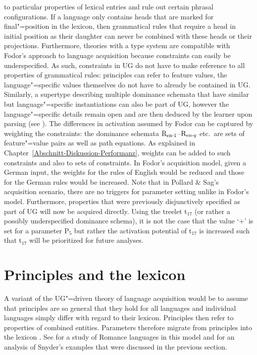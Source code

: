 to particular properties of lexical entries and rule out certain phrasal configurations.
If a language only contains heads that are marked for final"=position in the lexicon, then grammatical rules that
require a head in initial position as their daughter can never be combined with these heads or their projections.
Furthermore, theories with a type system are compatible with Fodor's approach to language acquisition because 
constraints can easily be underspecified. As such, constraints in UG do not have to make reference to all properties
of grammatical rules: principles can refer to feature values, the language"=specific values themselves do not have to
already be contained in UG. Similarly, a supertype describing multiple dominance schemata that have
similar but language"=specific instantiations can also be part of UG, however the language"=specific details remain open and are then deduced by the learner
upon parsing (see \citealp[Section~9.2]{AW98a}). The differences in activation assumed by Fodor can be captured
by weighting the constraints: the dominance schemata $\text{R}_{\text{en}\text{\normalfont -}1}$--$\text{R}_{\text{en}\text{\normalfont -} q}$ etc.\ are sets of
feature"=value pairs as well as path equations. As explained in Chapter~\ref{Abschnitt-Diskussion-Performanz}, 
weights can be added to such constraints and also to sets of constraints. In Fodor's acquisition model, given a German input, the weights for the rules
of English would be reduced and those for the German rules would be increased. Note that in Pollard
\& Sag's acquisition scenario, there are no triggers for parameter
setting unlike in Fodor's model.
Furthermore, properties that were previously disjunctively specified as part of UG will now be
acquired directly. Using the treelet t$_{17}$ (or rather a possibly underspecified dominance
schema), it is not the case that the value `+' is set for a parameter P$_5$  but rather the activation
potential of t$_{17}$ is increased such that t$_{17}$ will be prioritized for future
analyses.


\section{Principles and the lexicon}

A variant of the UG"=driven theory of language acquisition would be to assume that principles are so general that they hold
for all languages and individual languages simply differ with regard to their lexicon.
Principles then refer to properties of combined entities. Parameters therefore migrate from principles into the lexicon
\citep[]{Chomsky99a}. See \citet{MR2010a} for a study of Romance languages in this model and
\citet[]{SonS2008a} for an analysis of Snyder's examples that were discussed in the
previous section.

